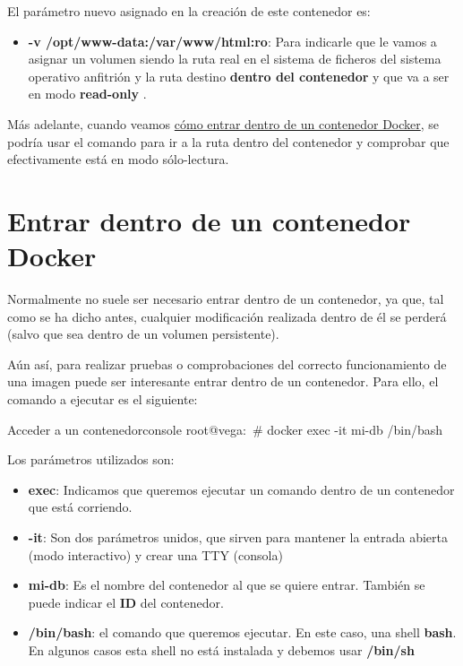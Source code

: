 El parámetro nuevo asignado en la creación de este contenedor es:
\begin{itemize}
    \item \textbf{-v /opt/www-data:/var/www/html:ro}: Para indicarle que le vamos a asignar un volumen siendo la ruta real en el sistema de ficheros del sistema operativo anfitrión  y la ruta destino \textbf{dentro del contenedor} y que va a ser en modo \textbf{read-only} .
\end{itemize}

Más adelante, cuando veamos \hyperlink{entrar_en_contenedor}{cómo entrar dentro de un contenedor Docker}, se podría usar el comando para ir a la ruta dentro del contenedor y comprobar que efectivamente está en modo sólo-lectura.

\hypertarget{entrar_en_contenedor}{}
\section{Entrar dentro de un contenedor Docker}
Normalmente no suele ser necesario entrar dentro de un contenedor, ya que, tal como se ha dicho antes, cualquier modificación realizada dentro de él se perderá (salvo que sea dentro de un volumen persistente).

Aún así, para realizar pruebas o comprobaciones del correcto funcionamiento de una imagen puede ser interesante entrar dentro de un contenedor. Para ello, el comando a ejecutar es el siguiente:

\begin{mycode}{Acceder a un contenedor}{console}{}
root@vega:~# docker exec -it mi-db /bin/bash
\end{mycode}

Los parámetros utilizados son:
\begin{itemize}
    \item \textbf{exec}: Indicamos que queremos ejecutar un comando dentro de un contenedor que está corriendo.
    \item \textbf{-it}: Son dos parámetros unidos, que sirven para mantener la entrada abierta (modo interactivo) y crear una TTY (consola)
    \item \textbf{mi-db}: Es el nombre del contenedor al que se quiere entrar. También se puede indicar el \textbf{ID} del contenedor.
    \item \textbf{/bin/bash}: el comando que queremos ejecutar. En este caso, una shell \textbf{bash}. En algunos casos esta shell no está instalada y debemos usar \textbf{/bin/sh}
\end{itemize}


